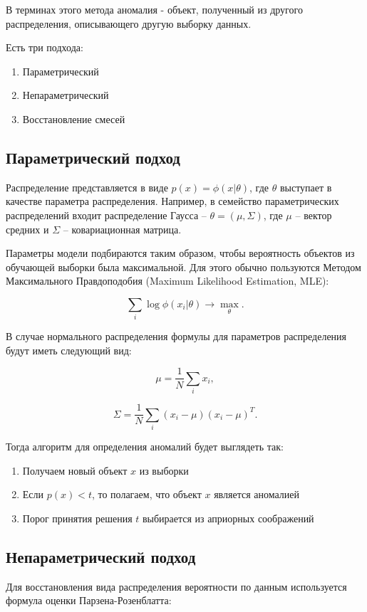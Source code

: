 В терминах этого метода аномалия - объект, полученный из другого распределения, описывающего другую выборку данных.

\noindent Есть три подхода:
\begin{enumerate}
  \item Параметрический
  \item Непараметрический
  \item Восстановление смесей
\end{enumerate}

\subsection{Параметрический подход}

Распределение представляется в виде $p(x)=\phi(x\vert\theta)$, где $\theta$ выступает в качестве параметра распределения. Например, в семейство параметрических распределений входит распределение Гаусса -- $\theta=(\mu, \Sigma)$, где $\mu$ -- вектор средних и $\Sigma$ -- ковариационная матрица.

Параметры модели подбираются таким образом, чтобы вероятность объектов из обучающей выборки была максимальной. Для этого обычно пользуются Методом Максимального Правдоподобия (Maximum Likelihood Estimation, MLE):

\[ \sum_{i}\log\phi(x_{i}\vert\theta) \rightarrow \max_{\theta}.\]

В случае нормального распределения формулы для параметров распределения будут иметь следующий вид:

\[\mu = \frac{1}{N}\sum_i x_i,\]

\[\Sigma = \frac{1}{N}\sum_i \left(x_i - \mu\right)\left(x_i - \mu\right)^T.\]

\noindent Тогда алгоритм для определения аномалий будет выглядеть так:
\begin{enumerate}
  \item Получаем новый объект $x$ из выборки
  \item Если $p(x) < t$, то полагаем, что объект $x$ является аномалией
  \item Порог принятия решения $t$ выбирается из априорных соображений
\end{enumerate}

\subsection{Непараметрический подход}

Для восстановления вида распределения вероятности по данным используется формула оценки Парзена-Розенблатта:

